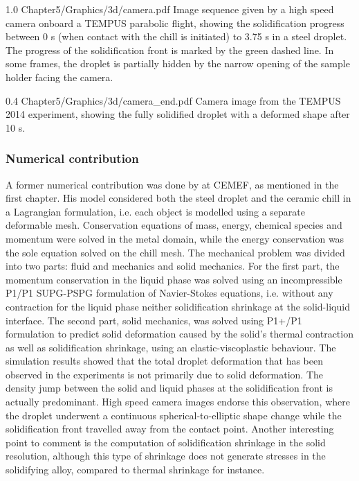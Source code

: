 \begin{figureth}
{1.0}
{Chapter5/Graphics/3d/camera.pdf}
{Image sequence given by a high speed camera onboard a TEMPUS parabolic flight, showing the 
solidification progress between 0 s (when contact with the chill is initiated) to 3.75 s in a  steel droplet. 
The progress of the solidification front is marked by the green dashed line. In some frames, the droplet is partially hidden by the narrow 
opening of the sample holder facing the camera.}
\label{fig:camera}
\end{figureth}

\begin{figureth}
{0.4}
{Chapter5/Graphics/3d/camera_end.pdf}
{Camera image from the TEMPUS 2014 experiment, showing the fully solidified droplet with a deformed shape after 10 s.}
\label{fig:camera_end}
\end{figureth}

\subsubsection{Numerical contribution}
A former numerical contribution was done by \citet{rivaux_simulation_2011} at CEMEF, as mentioned in the first chapter. 
His model considered both the steel droplet and the ceramic chill in a Lagrangian formulation, i.e. each object is
modelled using a separate deformable mesh. Conservation equations of mass, energy,
chemical species and momentum were solved in the metal domain, while the energy
conservation was the sole equation solved on the chill mesh. The mechanical problem was divided
into two parts: fluid and mechanics and solid mechanics. For the first part, the momentum conservation in the liquid phase was solved using an
incompressible P1/P1 SUPG-PSPG formulation of Navier-Stokes equations, i.e. 
without any contraction for the liquid phase neither solidification shrinkage at the solid-liquid interface.
The second part, solid mechanics,
was solved using P1+/P1 formulation to predict solid deformation caused by the solid's thermal contraction as well as solidification shrinkage, 
using an elastic-viscoplastic behaviour. 
The simulation results showed that the total droplet deformation that has been
observed in the experiments is not primarily due to solid deformation. The density jump
between the solid and liquid phases at the solidification front is actually predominant. High
speed camera images endorse this observation, where the droplet underwent a continuous
spherical-to-elliptic shape change while the solidification front travelled away from the
contact point. Another interesting point to comment is the computation of solidification
shrinkage in the solid resolution, although this type of shrinkage does not generate stresses 
in the solidifying alloy, compared to thermal shrinkage for instance.


